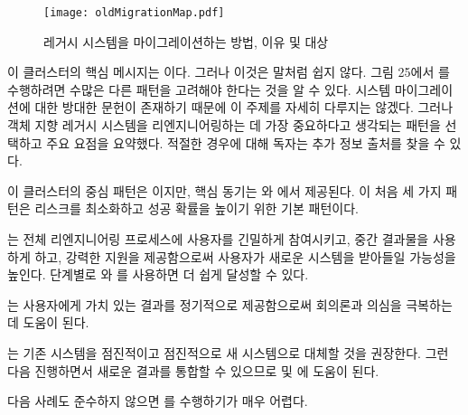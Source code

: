 \documentclass[a4paper,10pt,twoside]{book}
\begin{document}
\begin{figure}
\begin{center}
\texttt{[image: oldMigrationMap.pdf]}
\caption{레거시 시스템을 마이그레이션하는 방법, 이유 및 대상}
\end{center}
\end{figure}

이 클러스터의 핵심 메시지는 이다. 그러나 이것은 말처럼 쉽지 않다. 그림 25에서 를 수행하려면 수많은 다른 패턴을 고려해야 한다는 것을 알 수 있다. 시스템 마이그레이션에 대한 방대한 문헌이 존재하기 때문에 이 주제를 자세히 다루지는 않겠다. 그러나 객체 지향 레거시 시스템을 리엔지니어링하는 데 가장 중요하다고 생각되는 패턴을 선택하고 주요 요점을 요약했다. 적절한 경우에 대해 독자는 추가 정보 출처를 찾을 수 있다.

이 클러스터의 중심 패턴은 이지만, 핵심 동기는 와 에서 제공된다. 이 처음 세 가지 패턴은 리스크를 최소화하고 성공 확률을 높이기 위한 기본 패턴이다.

\begin{bulletlist}
\item {}는 전체 리엔지니어링 프로세스에 사용자를 긴밀하게 참여시키고, 중간 결과물을 사용하게 하고, 강력한 지원을 제공함으로써 사용자가 새로운 시스템을 받아들일 가능성을 높인다. 단계별로 와 를 사용하면 더 쉽게 달성할 수 있다.

\item {}는 사용자에게 가치 있는 결과를 정기적으로 제공함으로써 회의론과 의심을 극복하는 데 도움이 된다. 

\item {}는 기존 시스템을 점진적이고 점진적으로 새 시스템으로 대체할 것을 권장한다. 그런 다음 진행하면서 새로운 결과를 통합할 수 있으므로  및 에 도움이 된다.
\end{bulletlist}

다음 사례도 준수하지 않으면 를 수행하기가 매우 어렵다.
\end{document}
